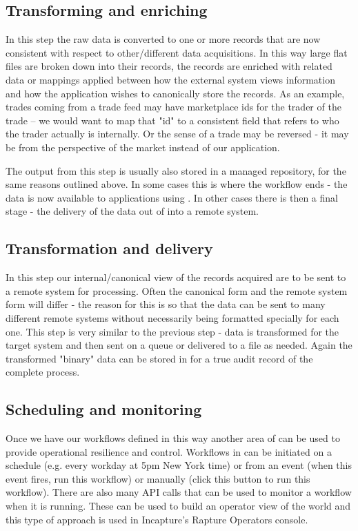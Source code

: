 \subsection{Transforming and enriching}
In this step the raw data is converted to one or more records that are now consistent with respect to other/different data acquisitions. In this way large flat files are
broken down into their records, the records are enriched with related data or mappings applied between how the external system views information and how the application wishes
to canonically store the records. As an example, trades coming from a trade feed may have marketplace ids for the trader of the trade -- we would want to map that "id" to a consistent
field that refers to who the trader actually is internally. Or the sense of a trade may be reversed - it may be from the perspective of the market instead of our application.

The output from this step is usually also stored in a \Rapture managed repository, for the same reasons outlined above. In some cases this is where the workflow ends - the data is now
available to applications using \Rapture. In other cases there is then a final stage - the delivery of the data out of \Rapture into a remote system.

\subsection{Transformation and delivery}
In this step our internal/canonical view of the records acquired are to be sent to a remote system for processing. Often the canonical form and the remote system form will differ - the reason
for this is so that the data can be sent to many different remote systems without necessarily being formatted specially for each one. This step is very similar to the previous step - data is transformed for the
target system and then sent on a queue or delivered to a file as needed. Again the transformed "binary" data can be stored in \Rapture for a true audit record of the complete process.

\subsection{Scheduling and monitoring}
Once we have our workflows defined in this way another area of \Rapture can be used to provide operational resilience and control. Workflows in \Rapture can be initiated on a schedule (e.g. every workday at 5pm New York time)
or from an event (when this event fires, run this workflow) or manually (click this button to run this workflow). There are also many \Rapture API calls that can be used to monitor a workflow when it is running.
These can be used to build an operator view of the world and this type of approach is used in Incapture's Rapture Operators console.

